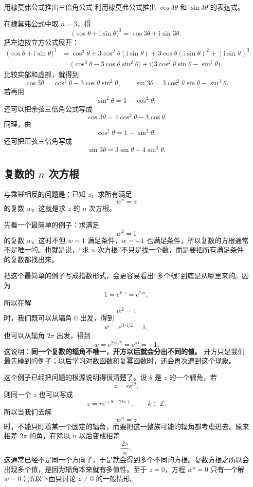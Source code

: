 \begin{lizi}{用棣莫弗公式推出三倍角公式}{}
利用棣莫弗公式推出 $\cos 3\theta$ 和 $\sin 3\theta$ 的表达式。

\begin{jie}
在棣莫弗公式中取 $n=3$，得
\[
\bigl(\cos\theta+\mathrm{i}\sin\theta\bigr)^3=\cos 3\theta+\mathrm{i}\sin 3\theta.
\]
把左边按立方公式展开：
\begin{align*}
    \bigl(\cos\theta+\mathrm{i}\sin\theta\bigr)^3
    &=\cos^3\theta+3\cos^2\theta(\mathrm{i}\sin\theta)
      +3\cos\theta(\mathrm{i}\sin\theta)^2+(\mathrm{i}\sin\theta)^3\\
    &=\bigl(\cos^3\theta-3\cos\theta\sin^2\theta\bigr)
      +\mathrm{i}\bigl(3\cos^2\theta\sin\theta-\sin^3\theta\bigr).
\end{align*}
比较实部和虚部，就得到
\[
\cos 3\theta=\cos^3\theta-3\cos\theta\sin^2\theta,
\qquad
\sin 3\theta=3\cos^2\theta\sin\theta-\sin^3\theta.
\]
若再用
\[
\sin^2\theta=1-\cos^2\theta,
\]
还可以把余弦三倍角公式写成
\[
\cos 3\theta=4\cos^3\theta-3\cos\theta.
\]
同理，由
\[
\cos^2\theta=1-\sin^2\theta,
\]
还可把正弦三倍角写成
\[
\sin 3\theta=3\sin\theta-4\sin^3\theta.
\]
\end{jie}
\end{lizi}

\subsection{\texorpdfstring{复数的 $n$ 次方根}{复数的 n 次方根}}

与乘幂相反的问题是：已知 $z$，求所有满足
\begin{equation}
    w^n=z
\end{equation}
的复数 $w$。这就是求 $z$ 的 $n$ 次方根。

先看一个最简单的例子：求满足
\[
w^2=1
\]
的复数 $w$。这时不但 $w=1$ 满足条件，$w=-1$ 也满足条件，所以复数的方根通常不是唯一的。也就是说，``求 $n$ 次方根''不只是找一个数，而是要把所有满足条件的复数都找出来。

把这个最简单的例子写成指数形式，会更容易看出``多个根''到底是从哪里来的。因为
\[
1=e^{0\cdot \mathrm{i}}=e^{2\pi \mathrm{i}},
\]
所以在解
\[
w^2=1
\]
时，我们既可以从辐角 $0$ 出发，得到
\[
w=e^{0\cdot \mathrm{i}/2}=1,
\]
也可以从辐角 $2\pi$ 出发，得到
\[
w=e^{2\pi \mathrm{i}/2}=e^{\pi \mathrm{i}}=-1.
\]
这说明：\textbf{同一个复数的辐角不唯一，开方以后就会分出不同的值。} 开方只是我们最先碰到的例子；以后学习对数函数和复幂函数时，还会再次遇到这个现象。

这个例子已经把问题的根源说明得很清楚了。设 $\theta$ 是 $z$ 的一个辐角，若
\[
z=re^{\mathrm{i}\theta},
\]
则同一个 $z$ 也可以写成
\[
z=re^{\mathrm{i}(\theta+2k\pi)},\qquad k\in\mathbb{Z}.
\]
所以当我们去解
\[
w^n=z
\]
时，不能只盯着某一个固定的辐角，而要把这一整族可能的辐角都考虑进去。原来相差 $2\pi$ 的角，在除以 $n$ 以后变成相差
\[
\frac{2\pi}{n},
\]
这通常已经不是同一个方向了，于是就会得到多个不同的方根。复数方根之所以会出现多个值，是因为辐角本来就有多值性。至于 $z=0$，方程 $w^n=0$ 只有一个解 $w=0$；所以下面只讨论 $z\neq 0$ 的一般情形。

